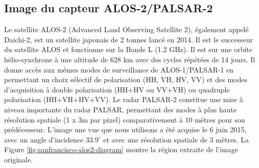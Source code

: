 \subsection{Image du capteur ALOS-2/PALSAR-2}

Le satellite ALOS-2 (Advanced Land Observing Satellite 2), également appelé Daichi-2, est un satellite japonais de 2 tonnes lancé en 2014. Il est le successeur du satellite ALOS et fonctionne sur la Bande L (1.2 GHz). Il est sur une orbite hélio-synchrone à une altitude de 628 km avec des cycles répétées de 14 jours. Il donne accès aux mêmes modes de surveillance de ALOS-1/PALSAR-1 en permettant un choix sélectif de polarisation (HH, VH, HV, VV) et des modes d’acquisition à double polarisation (HH+HV ou VV+VH) ou quadruple polarisation (HH+VH+HV+VV). Le radar PALSAR-2 constitue une mise à niveau importante du radar PALSAR, permettant des modes à plus haute résolution spatiale (1 x 3m par pixel) comparativement à 10 mètres pour son prédécesseur. L'image une vue que nous utilisons a été acquise le 6 juin 2015, avec un angle d'incidence $33.9^{\circ}$  et avec une résolution spatiale de 3 mètres.  La Figure \ref{fig:sanfrancisco-alos2-diagram} montre la région extraite de l'image originale.

